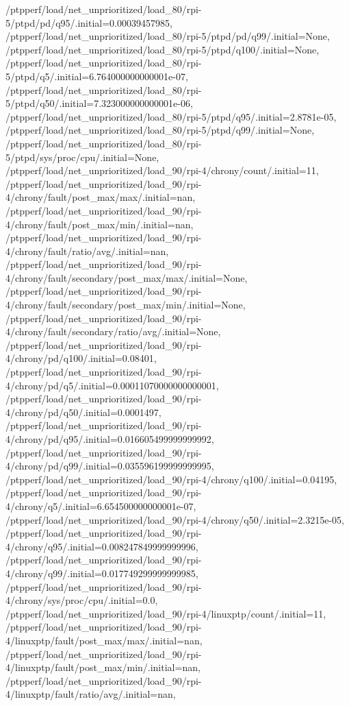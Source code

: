 {    /ptpperf/load/net_unprioritized/load_80/rpi-5/ptpd/pd/q95/.initial=0.00039457985,
    /ptpperf/load/net_unprioritized/load_80/rpi-5/ptpd/pd/q99/.initial=None,
    /ptpperf/load/net_unprioritized/load_80/rpi-5/ptpd/q100/.initial=None,
    /ptpperf/load/net_unprioritized/load_80/rpi-5/ptpd/q5/.initial=6.764000000000001e-07,
    /ptpperf/load/net_unprioritized/load_80/rpi-5/ptpd/q50/.initial=7.323000000000001e-06,
    /ptpperf/load/net_unprioritized/load_80/rpi-5/ptpd/q95/.initial=2.8781e-05,
    /ptpperf/load/net_unprioritized/load_80/rpi-5/ptpd/q99/.initial=None,
    /ptpperf/load/net_unprioritized/load_80/rpi-5/ptpd/sys/proc/cpu/.initial=None,
    /ptpperf/load/net_unprioritized/load_90/rpi-4/chrony/count/.initial=11,
    /ptpperf/load/net_unprioritized/load_90/rpi-4/chrony/fault/post_max/max/.initial=nan,
    /ptpperf/load/net_unprioritized/load_90/rpi-4/chrony/fault/post_max/min/.initial=nan,
    /ptpperf/load/net_unprioritized/load_90/rpi-4/chrony/fault/ratio/avg/.initial=nan,
    /ptpperf/load/net_unprioritized/load_90/rpi-4/chrony/fault/secondary/post_max/max/.initial=None,
    /ptpperf/load/net_unprioritized/load_90/rpi-4/chrony/fault/secondary/post_max/min/.initial=None,
    /ptpperf/load/net_unprioritized/load_90/rpi-4/chrony/fault/secondary/ratio/avg/.initial=None,
    /ptpperf/load/net_unprioritized/load_90/rpi-4/chrony/pd/q100/.initial=0.08401,
    /ptpperf/load/net_unprioritized/load_90/rpi-4/chrony/pd/q5/.initial=0.00011070000000000001,
    /ptpperf/load/net_unprioritized/load_90/rpi-4/chrony/pd/q50/.initial=0.0001497,
    /ptpperf/load/net_unprioritized/load_90/rpi-4/chrony/pd/q95/.initial=0.016605499999999992,
    /ptpperf/load/net_unprioritized/load_90/rpi-4/chrony/pd/q99/.initial=0.035596199999999995,
    /ptpperf/load/net_unprioritized/load_90/rpi-4/chrony/q100/.initial=0.04195,
    /ptpperf/load/net_unprioritized/load_90/rpi-4/chrony/q5/.initial=6.654500000000001e-07,
    /ptpperf/load/net_unprioritized/load_90/rpi-4/chrony/q50/.initial=2.3215e-05,
    /ptpperf/load/net_unprioritized/load_90/rpi-4/chrony/q95/.initial=0.008247849999999996,
    /ptpperf/load/net_unprioritized/load_90/rpi-4/chrony/q99/.initial=0.017749299999999985,
    /ptpperf/load/net_unprioritized/load_90/rpi-4/chrony/sys/proc/cpu/.initial=0.0,
    /ptpperf/load/net_unprioritized/load_90/rpi-4/linuxptp/count/.initial=11,
    /ptpperf/load/net_unprioritized/load_90/rpi-4/linuxptp/fault/post_max/max/.initial=nan,
    /ptpperf/load/net_unprioritized/load_90/rpi-4/linuxptp/fault/post_max/min/.initial=nan,
    /ptpperf/load/net_unprioritized/load_90/rpi-4/linuxptp/fault/ratio/avg/.initial=nan,
}
